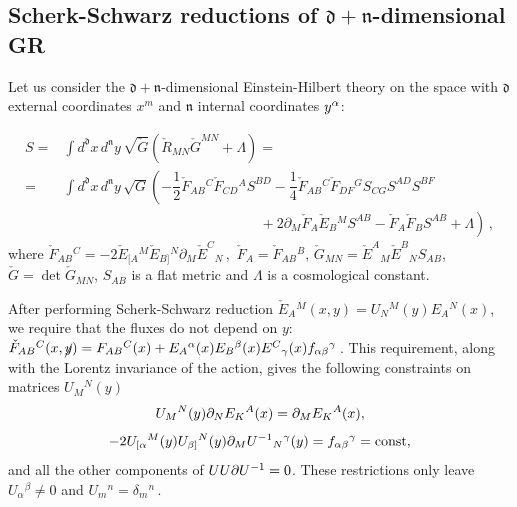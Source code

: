 \documentclass[12pt, utf8]{article}
\numberwithin{equation}{section}
\begin{document}
\subsection{Scherk-Schwarz reductions of $\mathfrak{d}+\mathfrak{n}$-dimensional GR}\label{GTRSS}

Let us consider the $\mathfrak{d}+\mathfrak{n}$-dimensional Einstein-Hilbert theory on the space with $\mathfrak{d}$ external coordinates $x^{m}$ and $\mathfrak{n}$ internal coordinates $y^{\alpha}$: 

\begin{equation}
    \begin{aligned}
        S = & \int d^\mathfrak{d}x \, d^\mathfrak{n}y \, \sqrt{\check{G}} \left( \check{R}_{M N} \check{G}^{M N} + \Lambda \right)  = \\
        = &\int d^\mathfrak{d}x \, d^\mathfrak{n}y \, \sqrt{G} \left( -\dfrac{1}{2} \check{F}_{A B}{}^{C}\check{F}_{C D}{}^{A} S^{B D}  - \dfrac{1}{4} \check{F}_{A B}{}^{C} \check{F}_{D F}{}^{G} S_{C G} S^{A D} S^{B F} \right.\\
        & \left. \qquad \qquad \qquad \qquad \qquad \qquad \qquad + 2 \partial_{M}{\check{F}_{A} } \check{E}_{B}{}^{M} S^{A B}- \check{F}_{A} \check{F}_{B} S^{A B} + \Lambda \right) \, , 
    \end{aligned}
\end{equation}
where $ \check{F}_{A B}{}^{C} = - 2 \check{E}_{[A}{}^{M} \check{E}_{B]}{}^{N} \partial_{M}{\check{E}^{C}{}_{N}} \, ,$ $\check{F}_{A} = \check{F}_{A B}{}^{B}$, $\check{G}_{MN} = \check{E}^{A}{}_{M} \check{E}^{B}{}_{N} S_{AB}$, $\check{G} = \det \check{G}_{MN}$, $S_{AB}$ is a flat metric and $\Lambda$ is a cosmological constant. 

After performing Scherk-Schwarz reduction \cite{Scherk:1979zr} $\check{E}_{A}{}^{M}(x,y) = U_{N}{}^{M}(y) E_{A}{}^{N}(x) $, we require that the fluxes do not depend on $y$: $\check{F}_{A B}{}^{C}(x,\cancel{y}) = F_{A B}{}^{C}(x) + E_{A}{}^{\alpha}(x) E_{B}{}^{\beta}(x) E^{C}{}_{\gamma}(x) f_{\alpha \beta}{}^{\gamma} \, $. This requirement, along with the Lorentz invariance of the action, gives the following constraints on matrices $U_{M}{}^{N}(y)$
\begin{equation}
    U_{M}{}^{N}(y) \partial_{N} E_{K}{}^{A}(x) = \partial_{M} E_{K}{}^{A}(x),
\end{equation}
\begin{equation}
    - 2 U_{[\alpha}{}^{M}(y) U_{\beta]}{}^{N}(y) \partial_{M}{U^{-1}{}_{N}{}^{\gamma}}(y) = f_{\alpha \beta}{}^{\gamma} = \text{const}, 
\end{equation}
and all the other components of $UU\partial U^{-1} = 0$. These restrictions only leave $U_{\alpha}{}^{\beta} \neq 0$ and $U_{m}{}^{n} = \delta_{m}{}^{n} \, .$
\end{document}
